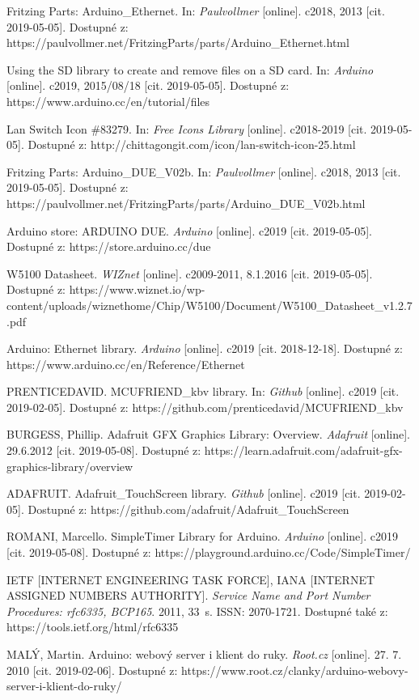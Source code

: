 \renewcommand{\refname}{Reference}
\begin{thebibliography}{20}

Fritzing Parts: Arduino\_Ethernet. In: \textit{Paulvollmer} [online]. c2018, 2013 [cit. 2019-05-05]. Dostupné z: https://paulvollmer.net/FritzingParts/parts/Arduino\_Ethernet.html

Using the SD library to create and remove files on a SD card. In: \textit{Arduino} [online]. c2019, 2015/08/18 [cit. 2019-05-05]. Dostupné z: https://www.arduino.cc/en/tutorial/files

Lan Switch Icon \#83279. In: \textit{Free Icons Library} [online]. c2018-2019 [cit. 2019-05-05]. Dostupné z: http://chittagongit.com/icon/lan-switch-icon-25.html

Fritzing Parts: Arduino\_DUE\_V02b. In: \textit{Paulvollmer} [online]. c2018, 2013 [cit. 2019-05-05]. Dostupné z: https://paulvollmer.net/FritzingParts/parts/Arduino\_DUE\_V02b.html

Arduino store: ARDUINO DUE. \textit{Arduino} [online]. c2019 [cit. 2019-05-05]. Dostupné z: https://store.arduino.cc/due

W5100 Datasheet. \textit{WIZnet} [online]. c2009-2011, 8.1.2016 [cit. 2019-05-05]. Dostupné z: https://www.wiznet.io/wp-content/uploads/wiznethome/Chip/W5100/Document/W5100\_Datasheet\_v1.2.7.pdf

Arduino: Ethernet library. \textit{Arduino} [online]. c2019 [cit. 2018-12-18]. Dostupné z: https://www.arduino.cc/en/Reference/Ethernet

PRENTICEDAVID. MCUFRIEND\_kbv library. In: \textit{Github} [online]. c2019 [cit. 2019-02-05]. Dostupné z: https://github.com/prenticedavid/MCUFRIEND\_kbv

BURGESS, Phillip. Adafruit GFX Graphics Library: Overview. \textit{Adafruit} [online]. 29.6.2012 [cit. 2019-05-08]. Dostupné z: https://learn.adafruit.com/adafruit-gfx-graphics-library/overview

ADAFRUIT. Adafruit\_TouchScreen library. \textit{Github} [online]. c2019 [cit. 2019-02-05]. Dostupné z: https://github.com/adafruit/Adafruit\_TouchScreen

ROMANI, Marcello. SimpleTimer Library for Arduino. \textit{Arduino} [online]. c2019 [cit. 2019-05-08]. Dostupné z: https://playground.arduino.cc/Code/SimpleTimer/

IETF [INTERNET ENGINEERING TASK FORCE], IANA [INTERNET ASSIGNED NUMBERS AUTHORITY]. \textit{Service Name and Port Number Procedures: rfc6335, BCP165}. 2011, 33~s. ISSN: 2070-1721. Dostupné také z: https://tools.ietf.org/html/rfc6335

MALÝ, Martin. Arduino: webový server i klient do ruky. \textit{Root.cz} [online]. 27. 7. 2010 [cit. 2019-02-06]. Dostupné z: https://www.root.cz/clanky/arduino-webovy-server-i-klient-do-ruky/


\end{thebibliography}

